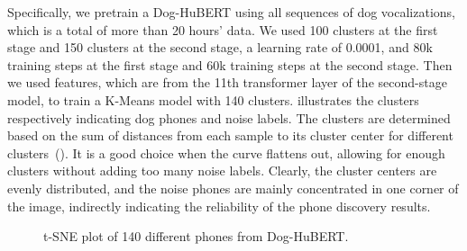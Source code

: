 
Specifically, we pretrain a Dog-HuBERT using all sequences of dog vocalizations, which is a total of more than 20 hours' data.
We used 100 clusters at the first stage and 150 clusters at the second stage, a learning rate of 0.0001, and 80k training steps at the first stage and 60k training steps at the second stage. Then we used features, which are from the 11th transformer layer of the second-stage model, to train a K-Means model with 140 clusters.  illustrates the clusters respectively indicating dog phones and noise labels. The clusters are determined based on the sum of distances from each sample to its cluster center for different clusters~(). It is a good choice when the curve flattens out, allowing for enough clusters without adding too many noise labels. Clearly, the cluster centers are evenly distributed, and the noise phones are mainly concentrated in one corner of the image, indirectly indicating the reliability of the phone discovery results.

\begin{figure}[th]
	\caption{t-SNE plot of 140 different phones from Dog-HuBERT.}
	\label{fig:cluster}
\end{figure}

